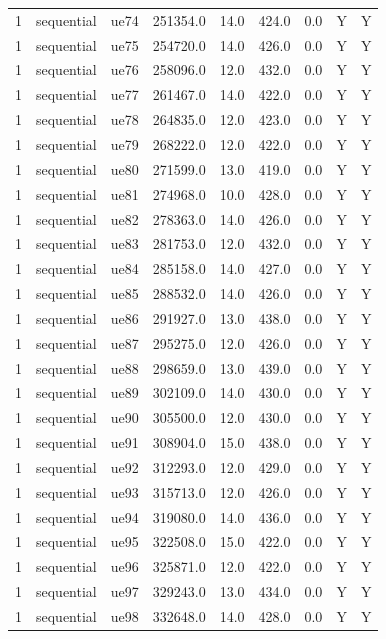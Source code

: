 \begin{table}[ht]
\begin{tabular}{|c|c|c|c|c|c|c|c|c|}
1 & sequential & ue74 & 251354.0 & 14.0 & 424.0 & 0.0 & Y & Y \\
1 & sequential & ue75 & 254720.0 & 14.0 & 426.0 & 0.0 & Y & Y \\
1 & sequential & ue76 & 258096.0 & 12.0 & 432.0 & 0.0 & Y & Y \\
1 & sequential & ue77 & 261467.0 & 14.0 & 422.0 & 0.0 & Y & Y \\
1 & sequential & ue78 & 264835.0 & 12.0 & 423.0 & 0.0 & Y & Y \\
1 & sequential & ue79 & 268222.0 & 12.0 & 422.0 & 0.0 & Y & Y \\
1 & sequential & ue80 & 271599.0 & 13.0 & 419.0 & 0.0 & Y & Y \\
1 & sequential & ue81 & 274968.0 & 10.0 & 428.0 & 0.0 & Y & Y \\
1 & sequential & ue82 & 278363.0 & 14.0 & 426.0 & 0.0 & Y & Y \\
1 & sequential & ue83 & 281753.0 & 12.0 & 432.0 & 0.0 & Y & Y \\
1 & sequential & ue84 & 285158.0 & 14.0 & 427.0 & 0.0 & Y & Y \\
1 & sequential & ue85 & 288532.0 & 14.0 & 426.0 & 0.0 & Y & Y \\
1 & sequential & ue86 & 291927.0 & 13.0 & 438.0 & 0.0 & Y & Y \\
1 & sequential & ue87 & 295275.0 & 12.0 & 426.0 & 0.0 & Y & Y \\
1 & sequential & ue88 & 298659.0 & 13.0 & 439.0 & 0.0 & Y & Y \\
1 & sequential & ue89 & 302109.0 & 14.0 & 430.0 & 0.0 & Y & Y \\
1 & sequential & ue90 & 305500.0 & 12.0 & 430.0 & 0.0 & Y & Y \\
1 & sequential & ue91 & 308904.0 & 15.0 & 438.0 & 0.0 & Y & Y \\
1 & sequential & ue92 & 312293.0 & 12.0 & 429.0 & 0.0 & Y & Y \\
1 & sequential & ue93 & 315713.0 & 12.0 & 426.0 & 0.0 & Y & Y \\
1 & sequential & ue94 & 319080.0 & 14.0 & 436.0 & 0.0 & Y & Y \\
1 & sequential & ue95 & 322508.0 & 15.0 & 422.0 & 0.0 & Y & Y \\
1 & sequential & ue96 & 325871.0 & 12.0 & 422.0 & 0.0 & Y & Y \\
1 & sequential & ue97 & 329243.0 & 13.0 & 434.0 & 0.0 & Y & Y \\
1 & sequential & ue98 & 332648.0 & 14.0 & 428.0 & 0.0 & Y & Y \\

\end{tabular}
\end{table}
